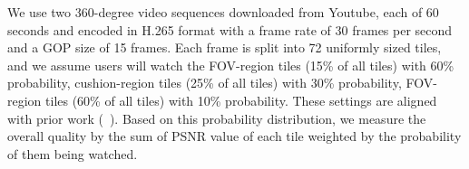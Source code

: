 \begin{figure}[!t]
	\centering
	\vspace{-0.2cm}
	\label{fig:bad}
\end{figure}

We use two 360-degree video sequences downloaded from Youtube, 
each of 60 seconds and encoded in H.265 format with a frame rate of 30 frames per second and a GOP size 
of 15 frames. Each frame is split into 72 uniformly 
sized tiles, and we assume users will watch the FOV-region tiles 
(15\% of all tiles) with 60\% probability, cushion-region tiles 
(25\% of all tiles) with 30\% probability, FOV-region tiles (60\% 
of all tiles) with 10\% probability. These settings are aligned 
with prior work (\eg~\cite{360ProbDASH}). Based on this probability 
distribution, we measure the overall quality by the sum 
of PSNR value of each tile weighted by the probability of them 
being watched.


